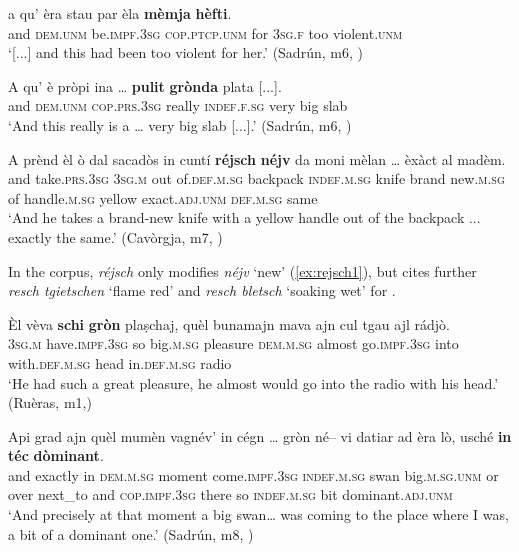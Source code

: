\ea
\label{ex:memi3}
\gll [...] a qu’ èra stau par èla \textbf{mèmja} \textbf{hèfti}.\\
{} and \textsc{dem.unm} be.\textsc{impf.3sg} \textsc{cop.ptcp.unm} for \textsc{3sg.f} too violent.\textsc{unm} \\
\glt `[...] and this had been too violent for her.' (Sadrún, m6, )
\z

\ea
\label{ex:pulit2}
\gll    A qu’ è pròpi ina … \textbf{pulit} \textbf{grònda} plata [...].\\
and \textsc{dem.unm} \textsc{cop.prs.3sg} really \textsc{indef.f.sg} {} very big slab\\
\glt `And this really is a … very big slab [...].' (Sadrún, m6, )
\z

\ea
\label{ex:rejsch1}
\gll A prènd èl ò dal sacadòs in cuntí \textbf{réjsch} \textbf{néjv} da moni mèlan … èxàct al madèm.\\
and take.\textsc{prs.3sg} \textsc{3sg.m} out of.\textsc{def.m.sg} backpack \textsc{indef.m.sg} knife brand new.\textsc{m.sg} of handle.\textsc{m.sg} yellow {} exact.\textsc{adj.unm} \textsc{def.m.sg} same\\
\glt `And he takes a brand-new knife with a yellow handle out of the backpack ... exactly the same.' (Cavòrgja, m7,  )
\z

In the corpus, \textit{réjsch} only modifies \textit{néjv} `new' (\ref{ex:rejsch1}), but \citet[931]{Decurtins2012} cites further \textit{resch tgietschen} `flame red' and \textit{resch bletsch} `soaking wet' for .

\ea
\label{ex:schi1}
\gll    Èl vèva \textbf{schi} \textbf{gròn} plaṣchaj, quèl bunamajn mava ajn cul tgau ajl rádjò.\\
\textsc{3sg.m} have.\textsc{impf.3sg} so big.\textsc{m.sg} pleasure \textsc{dem.m.sg} almost go.\textsc{impf.3sg} into with.\textsc{def.m.sg} head in.\textsc{def.m.sg} radio\\
\glt `He had such a great pleasure, he almost would go into the radio with his head.' (Ruèras, m1,)
\z

\ea
\label{ex:intec2}
\gll Api grad ajn quèl mumèn vagnév’ in cégn … gròn né– vi datiar ad èra lò, usché \textbf{in} \textbf{téc} \textbf{dòminant}.\\
and exactly in \textsc{dem.m.sg} moment come.\textsc{impf.3sg} \textsc{indef.m.sg} swan {} big.\textsc{m.sg.unm} or over next\_to and \textsc{cop.impf.3sg} there so \textsc{indef.m.sg} bit dominant.\textsc{adj.unm}\\
\glt `And precisely at that moment a big swan… was coming to the place where I was, a bit of a dominant one.' (Sadrún, m8, )
\z


